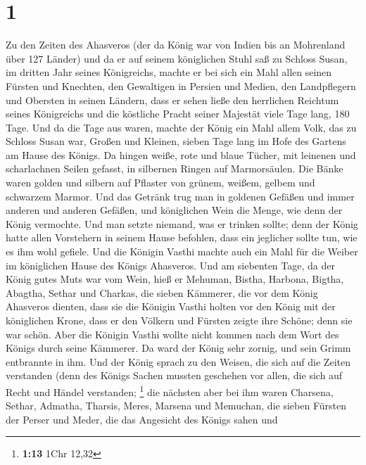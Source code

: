 \hypertarget{section}{%
\section{1}\label{section}}

 Zu den Zeiten des Ahasveros (der da König war von Indien
bis an Mohrenland über 127 Länder)  und da er auf seinem
königlichen Stuhl saß zu Schloss Susan,  im dritten Jahr
seines Königreichs, machte er bei sich ein Mahl allen seinen Fürsten und
Knechten, den Gewaltigen in Persien und Medien, den Landpflegern und
Obersten in seinen Ländern,  dass er sehen ließe den
herrlichen Reichtum seines Königreichs und die köstliche Pracht seiner
Majestät viele Tage lang, 180 Tage.  Und da die Tage aus
waren, machte der König ein Mahl allem Volk, das zu Schloss Susan war,
Großen und Kleinen, sieben Tage lang im Hofe des Gartens am Hause des
Königs.  Da hingen weiße, rote und blaue Tücher, mit
leinenen und scharlachnen Seilen gefasst, in silbernen Ringen auf
Marmorsäulen. Die Bänke waren golden und silbern auf Pflaster von
grünem, weißem, gelbem und schwarzem Marmor.  Und das
Getränk trug man in goldenen Gefäßen und immer anderen und anderen
Gefäßen, und königlichen Wein die Menge, wie denn der König vermochte.
 Und man setzte niemand, was er trinken sollte; denn der
König hatte allen Vorstehern in seinem Hause befohlen, dass ein
jeglicher sollte tun, wie es ihm wohl gefiele.  Und die
Königin Vasthi machte auch ein Mahl für die Weiber im königlichen Hause
des Königs Ahasveros.  Und am siebenten Tage, da der
König gutes Muts war vom Wein, hieß er Mehuman, Bistha, Harbona, Bigtha,
Abagtha, Sethar und Charkas, die sieben Kämmerer, die vor dem König
Ahasveros dienten,  dass sie die Königin Vasthi holten
vor den König mit der königlichen Krone, dass er den Völkern und Fürsten
zeigte ihre Schöne; denn sie war schön.  Aber die Königin
Vasthi wollte nicht kommen nach dem Wort des Königs durch seine
Kämmerer. Da ward der König sehr zornig, und sein Grimm entbrannte in
ihm.  Und der König sprach zu den Weisen, die sich auf
die Zeiten verstanden (denn des Königs Sachen mussten geschehen vor
allen, die sich auf Recht und Händel verstanden; \footnote{\textbf{1:13}
  1Chr 12,32}  die nächsten aber bei ihm waren Charsena,
Sethar, Admatha, Tharsis, Meres, Marsena und Memuchan, die sieben
Fürsten der Perser und Meder, die das Angesicht des Königs sahen und
